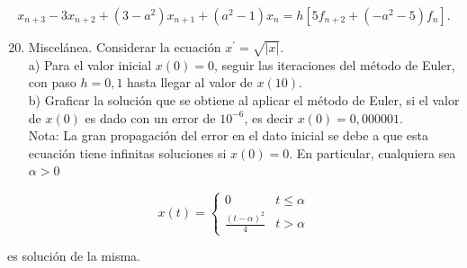 \documentclass[10pt]{article}
\begin{document}
$$
x_{n+3}-3 x_{n+2}+\left(3-a^{2}\right) x_{n+1}+\left(a^{2}-1\right) x_{n}=h\left[5 f_{n+2}+\left(-a^{2}-5\right) f_{n}\right] .
$$

\begin{enumerate}
  \setcounter{enumi}{19}
  \item Miscelánea. Considerar la ecuación $x^{\prime}=\sqrt{|x|}$.\\
a) Para el valor inicial $x(0)=0$, seguir las iteraciones del método de Euler, con paso $h=0,1$ hasta llegar al valor de $x(10)$.\\
b) Graficar la solución que se obtiene al aplicar el método de Euler, si el valor de $x(0)$ es dado con un error de $10^{-6}$, es decir $x(0)=0,000001$.\\
Nota: La gran propagación del error en el dato inicial se debe a que esta ecuación tiene infinitas soluciones si $x(0)=0$. En particular, cualquiera sea $\alpha>0$
\end{enumerate}

$$
x(t)= \begin{cases}0 & t \leq \alpha \\ \frac{(t-\alpha)^{2}}{4} & t>\alpha\end{cases}
$$

es solución de la misma.
\end{document}
